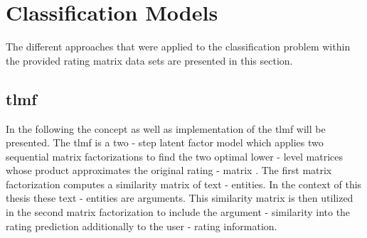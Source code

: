 \section{Classification Models}
\label{sec:models}
The different approaches that were applied to the classification problem within the provided rating matrix data sets are presented in this section. 

\subsection{\acrfull{tlmf}}
In the following the concept as well as implementation of the \acrshort{tlmf} will be presented.
The \acrshort{tlmf} is a two - step latent factor model which applies two sequential matrix factorizations 
to find the two optimal lower - level matrices whose product approximates the original rating - matrix \cite{li2016two}.
The first matrix factorization computes a similarity matrix of text - entities.
In the context of this thesis these text - entities are arguments. This similarity matrix is then utilized in the second
matrix factorization to include the argument - similarity into the rating prediction additionally to the user - rating information.

